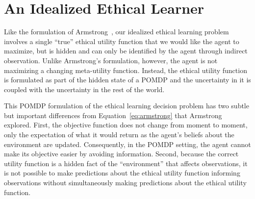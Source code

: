 \documentclass[11pt]{article}
\begin{document}

\section{An Idealized Ethical Learner}
Like the formulation of Armstrong~, our idealized ethical learning problem involves a single ``true'' ethical utility function that we would like the agent to maximize, but is hidden and can only be identified by the agent through indirect observation. Unlike Armstrong's formulation, however, the agent is not maximizing a changing meta-utility function. Instead, the ethical utility function is formulated as part of the hidden state of a POMDP and the uncertainty in it is coupled with the uncertainty in the rest of the world.

This POMDP formulation of the ethical learning decision problem has two subtle but important differences from Equation~\ref{eq:armstrong} that Armstrong explored. First, the objective function does not change from moment to moment, only the expectation of what it would return as the agent's beliefs about the environment are updated. Consequently, in the POMDP setting, the agent cannot make its objective easier by avoiding information. Second, because the correct utility function is a hidden fact of the ``environment'' that affects observations, it is not possible to make predictions about the ethical utility function informing observations without simultaneously making predictions about the ethical utility function.
\end{document}
